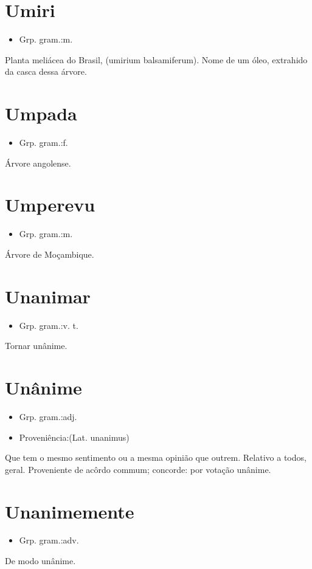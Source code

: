 \documentclass{article}
\begin{document}
\section{Umiri}
\begin{itemize}
\item {Grp. gram.:m.}
\end{itemize}
Planta meliácea do Brasil, (\textunderscore umirium balsamiferum\textunderscore ).
Nome de um óleo, extrahido da casca dessa árvore.
\section{Umpada}
\begin{itemize}
\item {Grp. gram.:f.}
\end{itemize}
Árvore angolense.
\section{Umperevu}
\begin{itemize}
\item {Grp. gram.:m.}
\end{itemize}
Árvore de Moçambique.
\section{Unanimar}
\begin{itemize}
\item {Grp. gram.:v. t.}
\end{itemize}
Tornar unânime.
\section{Unânime}
\begin{itemize}
\item {Grp. gram.:adj.}
\end{itemize}
\begin{itemize}
\item {Proveniência:(Lat. \textunderscore unanimus\textunderscore )}
\end{itemize}
Que tem o mesmo sentimento ou a mesma opinião que outrem.
Relativo a todos, geral.
Proveniente de acôrdo commum; concorde: \textunderscore por votação unânime\textunderscore .
\section{Unanimemente}
\begin{itemize}
\item {Grp. gram.:adv.}
\end{itemize}
De modo unânime.
\end{document}
